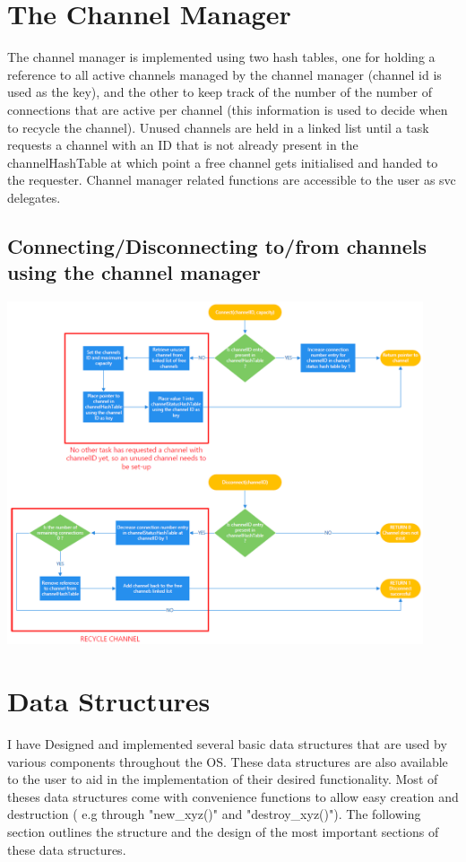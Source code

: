 \documentclass[12pt,a4paper]{article}
\begin{document}
 


\section{The Channel Manager}
The channel manager is implemented using two hash tables, one for holding a reference to all active channels managed by the channel manager (channel id is used as the key), and the other to keep track of the number of the number of connections that are active per channel (this information is used to decide when to recycle the channel). Unused channels are held in a linked list until a task requests a channel with an ID that is not already present in the channelHashTable at which point a free channel gets initialised and handed to the requester. Channel manager related functions are accessible to the user as svc delegates.

\subsection{Connecting/Disconnecting to/from channels using the channel manager}
\includegraphics[width=0.92\textwidth]{images/channelManagerOverview.png}\\

\pagebreak
\section{Data Structures}
I have Designed and implemented several basic data structures that are used by various components throughout the OS. These data structures are also available to the user to aid in the implementation of their desired functionality. Most of theses data structures come with convenience functions to allow easy creation  and destruction ( e.g through "new\_xyz()" and "destroy\_xyz()"). The following section outlines the structure and the design of the most important sections of these data structures.
\end{document}
